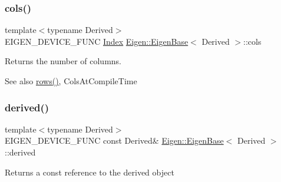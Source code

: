 \subsubsection{\texorpdfstring{cols()}{cols()}}
{\footnotesize\ttfamily template$<$typename Derived$>$ \\
E\+I\+G\+E\+N\+\_\+\+D\+E\+V\+I\+C\+E\+\_\+\+F\+U\+NC \mbox{\hyperlink{struct_eigen_1_1_eigen_base_a554f30542cc2316add4b1ea0a492ff02}{Index}} \mbox{\hyperlink{struct_eigen_1_1_eigen_base}{Eigen\+::\+Eigen\+Base}}$<$ Derived $>$\+::cols\hspace{0.3cm}{\ttfamily [inline]}}

\begin{DoxyReturn}{Returns}
the number of columns. 
\end{DoxyReturn}
\begin{DoxySeeAlso}{See also}
\mbox{\hyperlink{struct_eigen_1_1_eigen_base_a8141320ba8df384426c298b32b000d8e}{rows()}}, Cols\+At\+Compile\+Time 
\end{DoxySeeAlso}
\mbox{\label{class_eigen_1_1internal_1_1_band_matrix_base_ad0cbee5e2dfef3bbe9db5e6d5fe12cc0}} 
\subsubsection{\texorpdfstring{derived()}{derived()}\hspace{0.1cm}{\footnotesize\ttfamily [1/2]}}
{\footnotesize\ttfamily template$<$typename Derived$>$ \\
E\+I\+G\+E\+N\+\_\+\+D\+E\+V\+I\+C\+E\+\_\+\+F\+U\+NC const Derived\& \mbox{\hyperlink{struct_eigen_1_1_eigen_base}{Eigen\+::\+Eigen\+Base}}$<$ Derived $>$\+::derived\hspace{0.3cm}{\ttfamily [inline]}}

\begin{DoxyReturn}{Returns}
a const reference to the derived object 
\end{DoxyReturn}
\mbox{\label{class_eigen_1_1internal_1_1_band_matrix_base_a324b16961a11d2ecfd2d1b7dd7946545}} 
